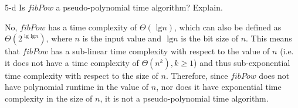 \documentclass[11pt]{article}
\newcommand{\tlg}{\text{ lg}}
\begin{document}
\begin{prob}{5-d}
Is $fibPow$ a pseudo-polynomial time algorithm? Explain.
\end{prob}
\begin{sol}

No, $fibPow$ has a time complexity of $\Theta(\tlg n)$, which can also be defined as $\Theta(2^{\tlg \tlg n})$, where $n$ is the input value and $\tlg n$ is the bit size of $n$. This means that $fibPow$ has a sub-linear time complexity with respect to the value of $n$ (i.e. it does not have a time complexity of $\Theta(n^{k}), k \geq 1$) and thus sub-exponential time complexity with respect to the size of $n$. Therefore, since $fibPow$ does not have polynomial runtime in the value of $n$, nor does it have exponential time complexity in the size of $n$, it is not a pseudo-polynomial time algorithm.


\end{sol}
\end{document}
